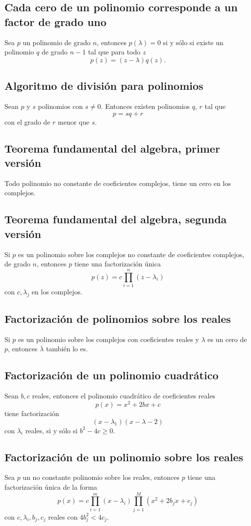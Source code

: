 \documentclass{article}
\begin{document}
\subsection{Cada cero de un polinomio corresponde a un factor de grado uno}
Sea $p$ un polinomio de grado $n$, entonces
$p(\lambda) = 0$ si y sólo si existe un polinomio $q$
de grado $n-1$ tal que para todo $z$
$$p(z)=(z-\lambda)q(z).$$

\subsection{Algoritmo de división para polinomios}
Sean $p$ y $s$ polinomios con $s\neq 0$. Entonces existen
polinomios $q$, $r$ tal que
$$p=sq+r$$
con el grado de $r$ menor que $s$.

\subsection{Teorema fundamental del algebra, primer versión}
Todo polinomio no constante de coeficientes complejos, tiene
un cero en los complejos.

\subsection{Teorema fundamental del algebra, segunda versión}
\label{algebrafundamental}
Si $p$ es un polinomio sobre los complejos no constante de 
coeficientes complejos, de grado $n$,
entonces $p$ tiene una factorización única
$$p(z)=c\prod^n_{i=1}(z-\lambda_i)$$
con $c,\lambda_j$ en los complejos.

\subsection{Factorización de polinomios sobre los reales}
Si $p$ es un polinomio sobre los complejos con coeficientes 
reales y $\lambda$ es un cero de $p$, entonces $\overline\lambda$ también
lo es.

\subsection{Factorización de un polinomio cuadrático}
Sean $b,c$ reales, entonces el polinomio cuadrático de
coeficientes reales
$$p(x)=x^2+2bx+c$$
tiene factorización
$$(x-\lambda_1)(x-\lambda-2)$$
con $\lambda_i$ reales, si y sólo si
$b^2-4c\geq 0$.

\subsection{Factorización de un polinomio sobre los reales}
Sea $p$ un no constante polinomio sobre los reales, entonces
$p$ tiene una factorización única de la forma
$$p(x) = c\prod^m_{i=1}(x-\lambda_i)
\prod^M_{j=1}(x^2+2b_jx+c_j)$$
con $c,\lambda_i,b_j,c_j$ reales con $4b^2_j < 4c_j$.
\newpage
\end{document}
